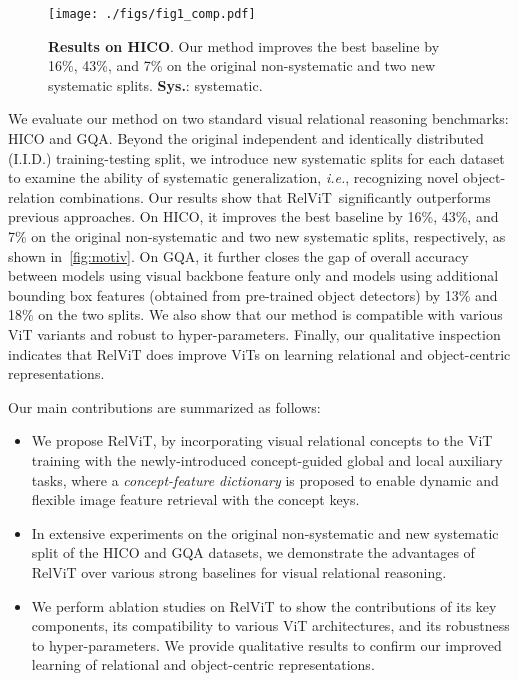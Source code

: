 \documentclass{article} \usepackage{iclr2022_conference,times}
\newcommand{\relvit}{RelViT }
\begin{document}
\begin{wrapfigure}{r}{0.35\textwidth}
  \begin{center}
    \vskip -0.22in
    \texttt{[image: ./figs/fig1\_comp.pdf]}
  \end{center}\vskip -0.2in
  \caption{\textbf{Results on HICO}. Our method improves the best baseline by 16\%, 43\%, and 7\% on the original non-systematic and two new systematic splits. \textbf{Sys.}: systematic.}
  \label{fig:motiv}
  \vskip -0.12in
\end{wrapfigure}
We evaluate our method on two standard visual relational reasoning benchmarks: HICO and GQA. Beyond the original independent and identically distributed (I.I.D.) training-testing split, we introduce new systematic splits for each dataset to examine the ability of systematic generalization, \textit{i.e.}, recognizing novel object-relation combinations. 
Our results show that RelViT~significantly outperforms previous approaches. On HICO, it improves the best baseline by 16\%, 43\%, and 7\% on the original non-systematic and two new systematic splits, respectively, as shown in~\autoref{fig:motiv}. On GQA, it further closes the gap of overall accuracy between models using visual backbone feature only and models using additional bounding box features (obtained from pre-trained object detectors) by 13\% and 18\% on the two splits. We also show that our method is compatible with various ViT variants and robust to hyper-parameters. Finally, our qualitative inspection indicates that RelViT does improve ViTs on learning relational and object-centric representations.


Our main contributions are summarized as follows:
\vskip -0.1in
\setlength{\leftmargini}{0.85em}
\begin{itemize}[topsep=0pt]
    \item We propose RelViT, by incorporating visual relational concepts to the ViT training with the newly-introduced concept-guided global and local auxiliary tasks, where a \emph{concept-feature dictionary} is proposed to enable dynamic and flexible image feature retrieval with the concept keys.
    \item In extensive experiments on the original non-systematic and new systematic split of the HICO and GQA datasets, we demonstrate the advantages of RelViT over various strong baselines for visual relational reasoning. 
    \item We perform ablation studies on \relvit to show the contributions of its key components, its compatibility to various ViT architectures, and its robustness to hyper-parameters. We provide qualitative results to confirm our improved learning of relational and object-centric representations.
\end{itemize}
\end{document}
